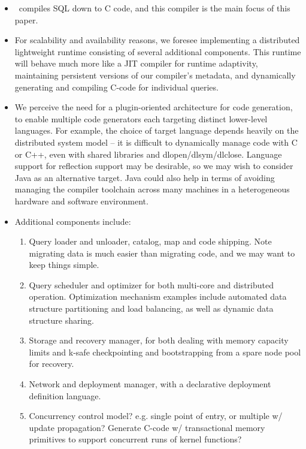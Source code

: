 \begin{itemize}
  \item \compiler\ compiles SQL down to C code, and this compiler is the main
  focus of this paper.

  \item For scalability and availability reasons, we foresee implementing a
  distributed lightweight runtime consisting of several additional
  components. This runtime will behave much more like a JIT compiler for runtime
  adaptivity, maintaining persistent versions of our compiler's metadata, and
  dynamically generating and compiling C-code for individual queries.

  \item We perceive the need for a plugin-oriented architecture for code
  generation, to enable multiple code generators each targeting distinct
  lower-level languages. For example, the choice of target language depends
  heavily on the distributed system model -- it is difficult to dynamically
  manage code with C or C++, even with shared libraries and dlopen/dlsym/dlclose.
  Language support for reflection support may be desirable, so we may wish to
  consider Java as an alternative target. Java could also help in terms of
  avoiding managing the compiler toolchain across many machines in a
  heterogeneous hardware and software environment.

  \item Additional components include:
  \begin{enumerate}
    \item Query loader and unloader, catalog, map and code shipping. Note
    migrating data is much easier than migrating code, and we may want to keep
    things simple.
    \item Query scheduler and optimizer for both multi-core and distributed
    operation. Optimization mechanism examples include automated data structure
    partitioning and load balancing, as well as dynamic data structure sharing.
    \item Storage and recovery manager, for both dealing with memory capacity
    limits and k-safe checkpointing and bootstrapping from a spare node pool for
    recovery.
    \item Network and deployment manager, with a declarative deployment
    definition language.
    \item Concurrency control model? e.g. single point of entry, or
    multiple w/ update propagation? Generate C-code w/ transactional memory
    primitives to support concurrent runs of kernel functions?
  \end{enumerate}
\end{itemize}